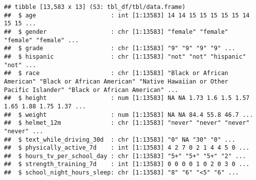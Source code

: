 \documentclass[
]{article}
\newenvironment{Shaded}{\begin{snugshade}}{\end{snugshade}}
\newcommand{\KeywordTok}[1]{\textcolor[rgb]{0.13,0.29,0.53}{\textbf{#1}}}
\newcommand{\NormalTok}[1]{#1}
\newcommand{\OperatorTok}[1]{\textcolor[rgb]{0.81,0.36,0.00}{\textbf{#1}}}
\newcommand{\StringTok}[1]{\textcolor[rgb]{0.31,0.60,0.02}{#1}}
\begin{document}
\begin{verbatim}
## tibble [13,583 x 13] (S3: tbl_df/tbl/data.frame)
##  $ age                     : int [1:13583] 14 14 15 15 15 15 15 14 15 15 ...
##  $ gender                  : chr [1:13583] "female" "female" "female" "female" ...
##  $ grade                   : chr [1:13583] "9" "9" "9" "9" ...
##  $ hispanic                : chr [1:13583] "not" "not" "hispanic" "not" ...
##  $ race                    : chr [1:13583] "Black or African American" "Black or African American" "Native Hawaiian or Other Pacific Islander" "Black or African American" ...
##  $ height                  : num [1:13583] NA NA 1.73 1.6 1.5 1.57 1.65 1.88 1.75 1.37 ...
##  $ weight                  : num [1:13583] NA NA 84.4 55.8 46.7 ...
##  $ helmet_12m              : chr [1:13583] "never" "never" "never" "never" ...
##  $ text_while_driving_30d  : chr [1:13583] "0" NA "30" "0" ...
##  $ physically_active_7d    : int [1:13583] 4 2 7 0 2 1 4 4 5 0 ...
##  $ hours_tv_per_school_day : chr [1:13583] "5+" "5+" "5+" "2" ...
##  $ strength_training_7d    : int [1:13583] 0 0 0 0 1 0 2 0 3 0 ...
##  $ school_night_hours_sleep: chr [1:13583] "8" "6" "<5" "6" ...
\end{verbatim}

\begin{Shaded}
\end{Shaded}
\end{document}
